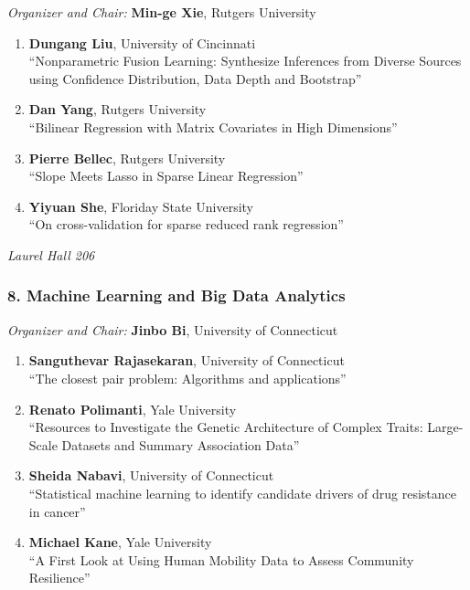 \emph{Organizer and Chair:} \textbf{Min-ge Xie}, Rutgers University

\begin{enumerate}
\item \textbf{Dungang Liu}, University of Cincinnati \\
``Nonparametric Fusion Learning: Synthesize Inferences from Diverse Sources using Confidence Distribution, Data Depth and Bootstrap''
\item \textbf{Dan Yang}, Rutgers University \\
``Bilinear Regression with Matrix Covariates in High Dimensions''
\item \textbf{Pierre Bellec}, Rutgers University \\
``Slope Meets Lasso in Sparse Linear Regression''
\item \textbf{Yiyuan She}, Floriday State University \\
``On cross-validation for sparse reduced rank regression''
\end{enumerate}

\emph{Laurel Hall 206} \\[.5em]

\subsubsection*{8. Machine Learning and Big Data Analytics}

\emph{Organizer and Chair:} \textbf{Jinbo Bi}, University of Connecticut

\begin{enumerate}
\item \textbf{Sanguthevar Rajasekaran}, University of Connecticut \\
``The closest pair problem: Algorithms and applications''
\item \textbf{Renato Polimanti}, Yale University \\
``Resources to Investigate the Genetic Architecture of Complex Traits: Large-Scale Datasets and Summary Association Data''
\item \textbf{Sheida Nabavi}, University of Connecticut \\
``Statistical machine learning to identify candidate drivers of drug resistance in cancer''
\item \textbf{Michael Kane}, Yale University \\
``A First Look at Using Human Mobility Data to Assess Community Resilience''
\end{enumerate}


